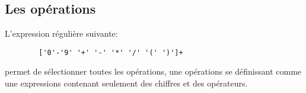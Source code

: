 \subsection{Les opérations}
    L'expression régulière suivante:
    \begin{verbatim}
        ['0'-'9' '+' '-' '*' '/' '(' ')']+
    \end{verbatim}
    permet de sélectionner toutes les opérations, une opérations se définissant comme une expressions contenant seulement des chiffres et des opérateurs.